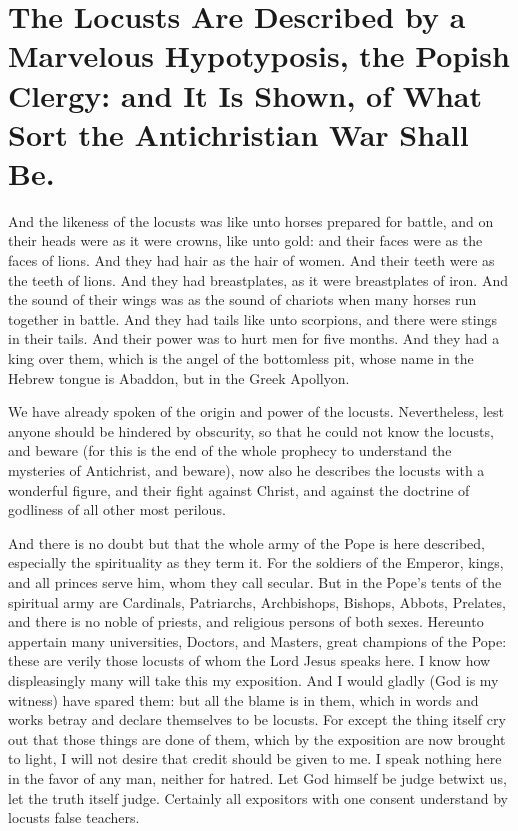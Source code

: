 \chapter[Sermon 40. The Locusts Are Described by a Marvelous Hypotyposis, the Popish Clergy: and It Is Shown, of What Sort the Antichristian War Shall Be.]{The Locusts Are Described by a Marvelous Hypotyposis, the Popish Clergy: and It Is Shown, of What Sort the Antichristian War Shall Be.}
\label{sermon:040}

And the likeness of the locusts was like unto horses prepared for battle, and on their heads were as it were crowns, like unto gold: and their faces were as the faces of lions. And they had hair as the hair of women. And their teeth were as the teeth of lions. And they had breastplates, as it were breastplates of iron. And the sound of their wings was as the sound of chariots when many horses run together in battle. And they had tails like unto scorpions, and there were stings in their tails. And their power was to hurt men for five months. And they had a king over them, which is the angel of the bottomless pit, whose name in the Hebrew tongue is Abaddon, but in the Greek Apollyon.

We have already spoken of the origin and power of the locusts. Nevertheless, lest anyone should be hindered by obscurity, so that he could not know the locusts, and beware (for this is the end of the whole prophecy to understand the mysteries of Antichrist, and beware), now also he describes the locusts with a wonderful figure, and their fight against Christ, and against the doctrine of godliness of all other most perilous.

And there is no doubt but that the whole army of the Pope is here described, especially the spirituality as they term it. For the soldiers of the Emperor, kings, and all princes serve him, whom they call secular. But in the Pope’s tents of the spiritual army are Cardinals, Patriarchs, Archbishops, Bishops, Abbots, Prelates, and there is no noble of priests, and religious persons of both sexes. Hereunto appertain many universities, Doctors, and Masters, great champions of the Pope: these are verily those locusts of whom the Lord Jesus speaks here. I know how displeasingly many will take this my exposition. And I would gladly (God is my witness) have spared them: but all the blame is in them, which in words and works betray and declare themselves to be locusts. For except the thing itself cry out that those things are done of them, which by the exposition are now brought to light, I will not desire that credit should be given to me. I speak nothing here in the favor of any man, neither for hatred. Let God himself be judge betwixt us, let the truth itself judge. Certainly all expositors with one consent understand by locusts false teachers.

